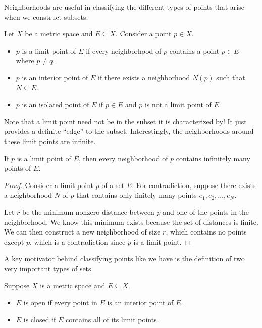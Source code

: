 \documentclass[../m131main.tex]{subfiles}
\begin{document}
Neighborhoods are useful in classifying the different types of points that arise when we construct subsets.

\begin{definition}
    Let $X$ be a metric space and $E \subseteq X$.
    Consider a point $p \in X$.
    \begin{itemize}
        \item $p$ is a limit point of $E$ if every neighborhood of $p$ contains a point $p \in E$ where $p \neq q$.
        \item $p$ is an interior point of $E$ if there exists a neighborhood $N(p)$ such that $N \subseteq E$.
        \item $p$ is an isolated point of $E$ if $p \in E$ and $p$ is not a limit point of $E$.
    \end{itemize}
\end{definition}

Note that a limit point need not be in the subset it is characterized by!
It just provides a definite ``edge'' to the subset.
Interestingly, the neighborhoods around these limit points are infinite.

\begin{theorem}
    If $p$ is a limit point of $E$, then every neighborhood of $p$ contains infinitely many points of $E$.
\end{theorem}

\begin{proof}
    Consider a limit point $p$ of a set $E$.
    For contradiction, suppose there exists a neighborhood $N$ of $p$ that contains only finitely many points $e_1, e_2, \ldots, e_N$.

    Let $r$ be the minimum nonzero distance between $p$ and one of the points in the neighborhood.
    We know this minimum exists because the set of distances is finite.
    We can then construct a new neighborhood of size $r$, which contains no points except $p$, which is a contradiction since $p$ is a limit point.
\end{proof}

A key motivator behind classifying points like we have is the definition of two very important types of sets.

\begin{definition}
    Suppose $X$ is a metric space and $E \subseteq X$.
    \begin{itemize}
        \item $E$ is open if every point in $E$ is an interior point of $E$.
        \item $E$ is closed if $E$ contains all of its limit points.
    \end{itemize}
\end{definition}
\end{document}
